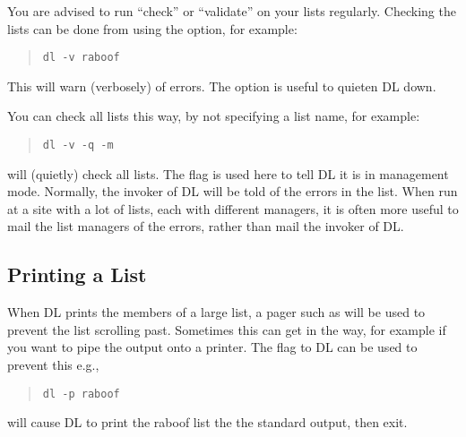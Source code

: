 You are advised to run ``check'' or ``validate'' on your lists regularly.
Checking the lists can be done from  using the 
option, for example:
\begin{quote}\begin{verbatim}
dl -v raboof
\end{verbatim}\end{quote}
This will warn (verbosely) of errors.  The  option is useful
to quieten DL down.  

You can check all lists this way, by not specifying a list name, for
example: 
\begin{quote}\begin{verbatim}
dl -v -q -m
\end{verbatim}\end{quote}
will (quietly) check all lists.  The  flag is used here to
tell DL it is in management mode. 
Normally, the invoker of DL will be told of the errors in the list.
When run at a site with a lot of lists, each with different managers, 
it is often more useful to mail the list managers of the errors,
rather than mail the invoker of DL.


\subsection{Printing a List}

When DL prints the members of a large list, a pager such as 
will be used to prevent the list scrolling past.
Sometimes this can get in the way, for example if you want to pipe the
output onto a printer. 
The  flag to DL can be used to prevent this e.g.,
\begin{quote}\begin{verbatim}
dl -p raboof
\end{verbatim}\end{quote}
will cause DL to print the raboof list the the standard output, then
exit.
